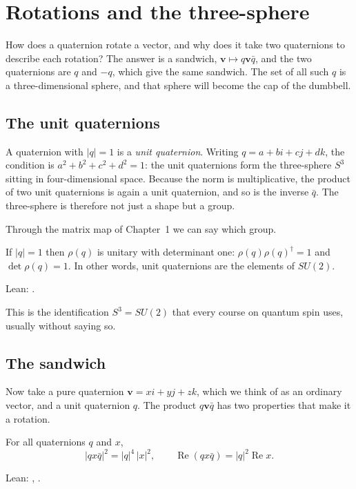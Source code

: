 \chapter{Rotations and the three-sphere}\label{ch:rotations}

\begin{questionbox}
How does a quaternion rotate a vector, and why does it take two quaternions to describe each rotation? The answer is a sandwich, $\mathbf v\mapsto q\mathbf v\bar q$, and the two quaternions are $q$ and $-q$, which give the same sandwich. The set of all such $q$ is a three-dimensional sphere, and that sphere will become the cap of the dumbbell.
\end{questionbox}

\section{The unit quaternions}

A quaternion with $|q|=1$ is a \emph{unit quaternion}. Writing $q=a+bi+cj+dk$, the condition is $a^2+b^2+c^2+d^2=1$: the unit quaternions form the three-sphere $S^3$ sitting in four-dimensional space. Because the norm is multiplicative, the product of two unit quaternions is again a unit quaternion, and so is the inverse $\bar q$. The three-sphere is therefore not just a shape but a group.

Through the matrix map of Chapter~1 we can say which group.

\begin{proposition}\proved
If $|q|=1$ then $\rho(q)$ is unitary with determinant one: $\rho(q)\rho(q)^\dagger=1$ and $\det\rho(q)=1$. In other words, unit quaternions are the elements of $SU(2)$.
\end{proposition}
\noindent Lean: .

This is the identification $S^3=SU(2)$ that every course on quantum spin uses, usually without saying so.

\section{The sandwich}

Now take a pure quaternion $\mathbf v=xi+yj+zk$, which we think of as an ordinary vector, and a unit quaternion $q$. The product $q\mathbf v\bar q$ has two properties that make it a rotation.

\begin{proposition}\proved
For all quaternions $q$ and $x$,
\[
|q x\bar q|^2=|q|^4\,|x|^2,\qquad \operatorname{Re}(q x\bar q)=|q|^2\operatorname{Re}x .
\]
\end{proposition}
\noindent Lean: , .

